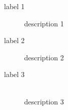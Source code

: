 \begin{description}
	\item[label 1] description 1
	\item[label 2] description 2
	\item[label 3] \mbox{} \\
	description 3
\end{description}
